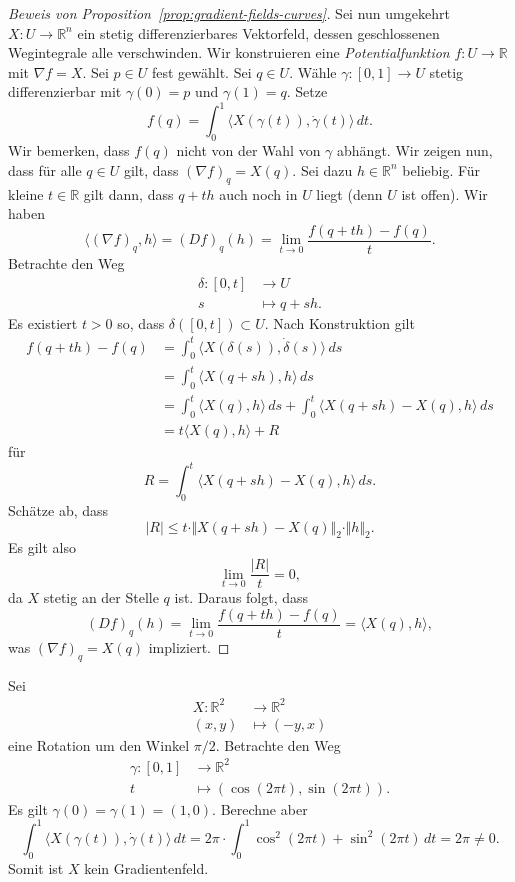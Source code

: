 \documentclass[../main.tex]{subfiles}
\begin{document}
\begin{proof}[Beweis von Proposition~\ref{prop:gradient-fields-curves}]
  Sei nun umgekehrt $X \colon U \to \mathbb{R}^n$
  ein stetig differenzierbares Vektorfeld, dessen geschlossenen
  Wegintegrale alle verschwinden.
  Wir konstruieren eine \emph{Potentialfunktion}
  $f \colon U \to \mathbb{R}$ mit $\nabla f = X$.
  Sei $p \in U $ fest gewählt.
  Sei $q \in U$.
  Wähle $\gamma \colon [0, 1] \to U$ stetig differenzierbar
  mit $\gamma(0) = p$ und $\gamma(1) = q$.
  Setze
   \[
     f(q) = \int_{0}^{1} \langle X(\gamma(t)), \dot \gamma(t) \rangle \, dt.
  \]
  Wir bemerken, dass $f(q)$ nicht von der Wahl von $\gamma$ abhängt.
  Wir zeigen nun, dass für alle $q \in U$ gilt,
  dass ${(\nabla f)}_q = X(q)$.
  Sei dazu $h \in \mathbb{R}^n$ beliebig.
  Für kleine $t \in \mathbb{R}$ gilt dann, dass $q + th$
  auch noch in $U$ liegt (denn $U$ ist offen).
  Wir haben
  \[
    \langle {(\nabla f)}_q, h \rangle
    = {(Df)}_q(h) = \lim_{t \to 0} \frac{f(q + th) - f(q)}{t}.
  \]
  Betrachte den Weg  
  \begin{align*}
    \delta \colon [0, t] & \to U \\
    s & \mapsto q + sh.
  \end{align*}
  Es existiert $t > 0$ so, dass $\delta([0, t]) \subset U$.
  Nach Konstruktion gilt
  \begin{align*}
     f(q + th) - f(q) 
     &=\int_{0}^{t} \langle X(\delta(s)), \dot \delta(s) \rangle \, ds  \\
     &= \int_{0}^{t} \langle X(q + sh), h \rangle \, ds \\
     &= \int_{0}^{t} \langle X(q), h \rangle \, ds
     + \int_{0}^{t} \langle X(q + sh) - X(q), h \rangle \, ds \\
     &= t \langle X(q), h \rangle + R
  \end{align*}
  für
  \[
    R = \int_{0}^{t} \langle X(q + sh) - X(q), h \rangle \, ds.
  \]
  Schätze ab, dass
  \[
    |R| \leq t \cdot \Vert X (q + sh) - X(q) \Vert_2 \cdot \Vert h \Vert_2.
  \]
  Es gilt also
  \[
    \lim_{t \to 0} \frac{|R|}{t} = 0,
  \]
  da $X$ stetig an der Stelle $q$ ist.
  Daraus folgt, dass
  \[
    {(Df)}_q (h) = \lim_{t \to 0} \frac{f(q + th) - f(q)}{t}
    = \langle X(q), h \rangle,
  \]
  was ${(\nabla f)}_q = X(q)$ impliziert.
\end{proof}

\begin{example}
  Sei
  \begin{align*}
    X \colon \mathbb{R}^2 & \to \mathbb{R}^2 \\
    (x, y) & \mapsto (-y, x)
  \end{align*}
  eine Rotation um den Winkel $\pi/2$.
  Betrachte den Weg
  \begin{align*}
    \gamma \colon [0, 1] & \to \mathbb{R}^2 \\
    t & \mapsto (\cos(2 \pi t), \sin(2 \pi t)).
  \end{align*}
  Es gilt $\gamma(0) = \gamma(1) = (1, 0)$.
  Berechne aber
  \[
    \int_{0}^{1} \langle X(\gamma(t)), \dot \gamma(t) \rangle \, dt
    = 2\pi \cdot \int_{0}^{1} \cos^2(2 \pi t) + \sin^2(2 \pi t) \, dt
    = 2 \pi \neq 0.
  \]
  Somit ist $X$ kein Gradientenfeld.
\end{example}
\end{document}
